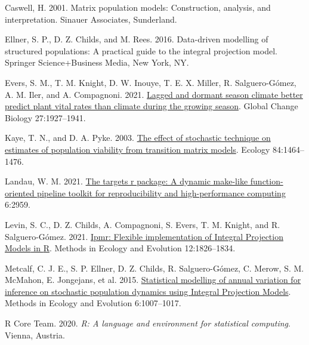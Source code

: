 \documentclass[
]{article}
\newlength{\cslhangindent}
\newlength{\cslentryspacingunit} %
\newenvironment{CSLReferences}[2] %
 {%
  \setlength{\parindent}{0pt}
  \ifodd #1
  \let\oldpar\par
  \def\par{\hangindent=\cslhangindent\oldpar}
  \fi
  \setlength{\parskip}{#2\cslentryspacingunit}
 }%
 {}
\begin{document}
\hypertarget{refs}{}
\begin{CSLReferences}{0}{0}
\leavevmode{}%
Caswell, H. 2001. Matrix population models: Construction, analysis, and interpretation. Sinauer Associates, Sunderland.

\leavevmode{}%
Ellner, S. P., D. Z. Childs, and M. Rees. 2016. Data-driven modelling of structured populations: A practical guide to the integral projection model. {Springer Science+Business Media}, {New York, NY}.

\leavevmode{}%
Evers, S. M., T. M. Knight, D. W. Inouye, T. E. X. Miller, R. Salguero-Gómez, A. M. Iler, and A. Compagnoni. 2021. \href{https://doi.org/10.1111/gcb.15519}{Lagged and dormant season climate better predict plant vital rates than climate during the growing season}. Global Change Biology 27:1927--1941.

\leavevmode{}%
Kaye, T. N., and D. A. Pyke. 2003. \href{https://doi.org/10.1890/0012-9658(2003)084\%5B1464:TEOSTO\%5D2.0.CO;2}{The effect of stochastic technique on estimates of population viability from transition matrix models}. Ecology 84:1464--1476.

\leavevmode{}%
Landau, W. M. 2021. \href{https://doi.org/10.21105/joss.02959}{The targets r package: A dynamic make-like function-oriented pipeline toolkit for reproducibility and high-performance computing} 6:2959.

\leavevmode{}%
Levin, S. C., D. Z. Childs, A. Compagnoni, S. Evers, T. M. Knight, and R. Salguero-Gómez. 2021. \href{https://doi.org/10.1111/2041-210X.13683}{Ipmr: {Flexible} implementation of {Integral Projection Models} in {R}}. Methods in Ecology and Evolution 12:1826--1834.

\leavevmode{}%
Metcalf, C. J. E., S. P. Ellner, D. Z. Childs, R. Salguero-Gómez, C. Merow, S. M. McMahon, E. Jongejans, et al. 2015. \href{https://doi.org/10.1111/2041-210X.12405}{Statistical modelling of annual variation for inference on stochastic population dynamics using {Integral Projection Models}}. Methods in Ecology and Evolution 6:1007--1017.

\leavevmode{}%
R Core Team. 2020. \emph{R: {A} language and environment for statistical computing}. {Vienna, Austria}.


\end{CSLReferences}
\end{document}
